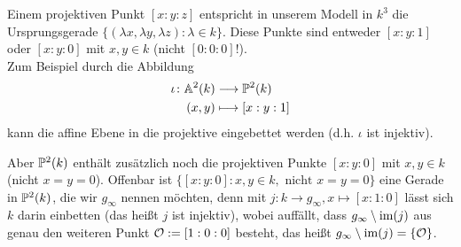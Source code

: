Einem projektiven Punkt $[x:y:z]$ entspricht in unserem Modell in $k^3$ die Ursprungsgerade $\{(\lambda x, \lambda y, \lambda z) : \lambda \in k\}$. Diese Punkte sind entweder $[x:y:1]$ oder $[x:y:0]$ mit $x,y \in k$ (nicht $[0:0:0]$!). \\
Zum Beispiel durch die Abbildung
\begin{equation}
\begin{aligned}
	\iota\colon \mathbb{A}^2(k) &\longrightarrow \mathbb{P}^2(k) \\
	(x,y) &\longmapsto [x:y:1]
\end{aligned}
\end{equation}
kann die affine Ebene in die projektive eingebettet werden (d.h. $\iota$ ist injektiv).
\begin{figure}[h]
	\centering
\end{figure}

\begin{bem}
	Aber $\mathbb{P}^2(k)$ enthält zusätzlich noch die projektiven Punkte $[x:y:0]$ mit $x,y \in k$ (nicht $x=y=0$). Offenbar ist $\{[x:y:0] : x,y \in k, \text{ nicht } x = y = 0\}$ eine Gerade in $\mathbb{P}^2(k)$, die wir  $g_\infty$ nennen möchten, denn mit $j \colon k \rightarrow g_\infty, x \mapsto [x:1:0]$ lässt sich $k$ darin einbetten (das heißt $j$ ist injektiv), wobei auffällt, dass $g_\infty \setminus \operatorname{im}(j)$ aus genau den weiteren Punkt $\mathcal{O} := [1:0:0]$ besteht, das heißt $g_\infty \setminus \operatorname{im}(j) = \{\mathcal{O}\}$.
\end{bem}

